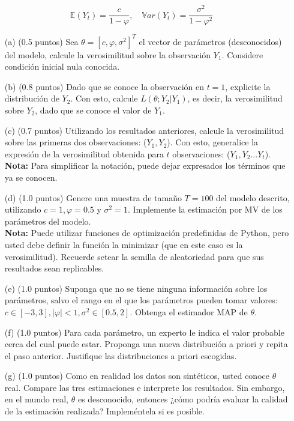 \documentclass[11pt,letterpaper]{article}
\begin{document}
\begin{equation*}
    \mathbb{E}(Y_t) = \dfrac{c}{1-\varphi}, \quad \mathbb{V}ar(Y_t) = \dfrac{\sigma^2}{1-\varphi^2}
\end{equation*}
\begin{itemize}
    \item[(a)] (0.5 puntos) Sea $\theta = [c, \varphi, \sigma^2]^T$ el vector de parámetros (desconocidos) del modelo, calcule la verosimilitud sobre la observación $Y_1$. Considere condición inicial nula conocida.
    \item[(b)] (0.8 puntos) Dado que se conoce la observación en $t=1$, explicite la distribución de $Y_2$. Con esto, calcule $L(\theta; Y_2|Y_1)$, es decir, la verosimilitud sobre $Y_2$, dado que se conoce el valor de $Y_1$.
    \item[(c)] (0.7 puntos) Utilizando los resultados anteriores, calcule la verosimilitud sobre las primeras dos observaciones: ($Y_1, Y_2$). Con esto, generalice la expresión de la verosimilitud obtenida para $t$ observaciones: ($Y_1, Y_2 \dots Y_t$). \\
    \textbf{Nota:} Para simplificar la notación, puede dejar expresados los términos que ya se conocen.
    \item[(d)] (1.0 puntos) Genere una muestra de tamaño $T=100$ del modelo descrito, utilizando $c=1, \varphi=0.5$ y $\sigma^2=1$. Implemente la estimación por MV de los parámetros del modelo. \\
    \textbf{Nota:} Puede utilizar funciones de optimización predefinidas de Python, pero usted debe definir la función la minimizar (que en este caso es la verosimilitud). Recuerde setear la semilla de aleatoriedad para que sus resultados sean replicables.
    \item[(e)] (1.0 puntos) Suponga que no se tiene ninguna información sobre los parámetros, salvo el rango en el que los parámetros pueden tomar valores: $c \in [-3, 3], |\varphi|<1, \sigma^2 \in [0.5, 2]$. Obtenga el estimador MAP de $\theta$.
    \item[(f)] (1.0 puntos) Para cada parámetro, un experto le indica el valor probable cerca del cual puede estar. Proponga una nueva distribución a priori y repita el paso anterior. Justifique las distribuciones a priori escogidas.
    \item[(g)] (1.0 puntos) Como en realidad los datos son sintéticos, usted conoce $\theta$ real. Compare las tres estimaciones e interprete los resultados. Sin embargo, en el mundo real, $\theta$ es desconocido, entonces ¿cómo podría evaluar la calidad de la estimación realizada? Impleméntela si es posible.
    
\end{itemize}
\end{document}
